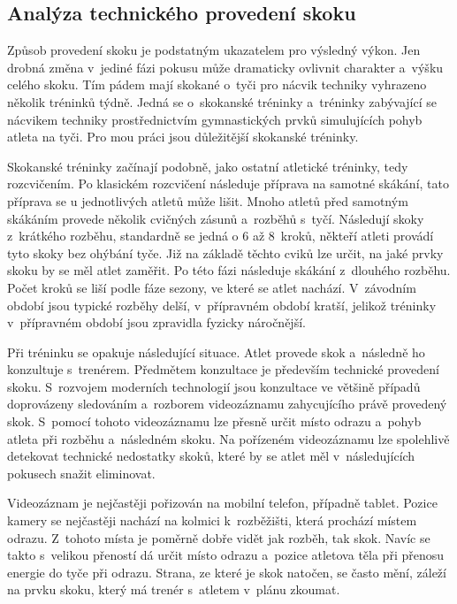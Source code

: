 \subsection{Analýza technického provedení skoku}

Způsob provedení skoku je podstatným ukazatelem pro výsledný výkon. Jen drobná změna v~jediné fázi pokusu může dramaticky ovlivnit charakter a~výšku celého skoku. Tím pádem mají skokané o~tyči pro nácvik techniky vyhrazeno několik tréninků týdně. Jedná se o~skokanské tréninky a~tréninky zabývající se nácvikem techniky prostřednictvím gymnastických prvků simulujících pohyb atleta na tyči. Pro mou práci jsou důležitější skokanské tréninky.

Skokanské tréninky začínají podobně, jako ostatní atletické tréninky, tedy rozcvičením. Po klasickém rozcvičení následuje příprava na samotné skákání, tato příprava se u jednotlivých atletů může lišit. Mnoho atletů před samotným skákáním provede několik cvičných zásunů a~rozběhů s~tyčí. Následují skoky z~krátkého rozběhu, standardně se jedná o 6 až 8~kroků, někteří atleti provádí tyto skoky bez ohýbání tyče. Již na základě těchto cviků lze určit, na jaké prvky skoku by se měl atlet zaměřit. Po této fázi následuje skákání z~dlouhého rozběhu. Počet kroků se liší podle fáze sezony, ve které se atlet nachází. V~závodním období jsou typické rozběhy delší, v~přípravném období kratší, jelikož tréninky v~přípravném období jsou zpravidla fyzicky náročnější.

Při tréninku se opakuje následující situace. Atlet provede skok a~následně ho konzultuje s~trenérem. Předmětem konzultace je především technické provedení skoku. S~rozvojem moderních technologií jsou konzultace ve většině případů doprovázeny sledováním a~rozborem videozáznamu zahycujícího právě provedený skok. S~pomocí tohoto videozáznamu lze přesně určit místo odrazu a~pohyb atleta při rozběhu a~následném skoku. Na pořízeném videozáznamu lze spolehlivě detekovat technické nedostatky skoků, které by se atlet měl v~následujících pokusech snažit eliminovat.

Videozáznam je nejčastěji pořizován na mobilní telefon, případně tablet. Pozice kamery se nejčastěji nachází na kolmici k~rozběžišti, která prochází místem odrazu. Z~tohoto místa je poměrně dobře vidět jak rozběh, tak skok. Navíc se takto s~velikou přeností dá určit místo odrazu a~pozice atletova těla při přenosu energie do tyče při odrazu. Strana, ze které je skok natočen, se často mění, záleží na prvku skoku, který má trenér s~atletem v~plánu zkoumat.

